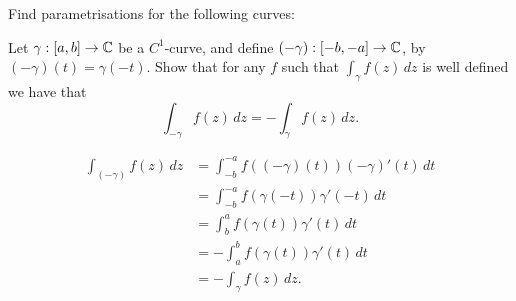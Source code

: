 
\setcounter{question}{0}
\question Find parametrisations for the following curves:

\setcounter{question}{1}
\question Let $\gamma: [a,b] \to \mathbb{C}$ be a $C^1$-curve,
and define $(-\gamma): [-b,-a] \to \mathbb{C}$,
by $(-\gamma)(t) = \gamma(-t)$.
Show that for any $f$ such that 
$\int_\gamma f(z) \,dz$ 
is well defined we have that
\[
    \int_{-\gamma} f(z) \,dz = -\int_\gamma f(z) \,dz.
\]
\begin{solution}
    \begin{align*}
        \int_{(-\gamma)} f(z) \,dz
        &= \int_{-b}^{-a} f((-\gamma)(t))(-\gamma)'(t) \, dt \\
        &= \int_{-b}^{-a} f(\gamma(-t)) \gamma'(-t) \, dt \\
        &= \int_b^a f(\gamma(t)) \gamma'(t) \,dt \\
        &= -\int_a^b f(\gamma(t)) \gamma'(t) \,dt \\
        &= -\int_\gamma f(z) \,dz.
    \end{align*}
\end{solution}

